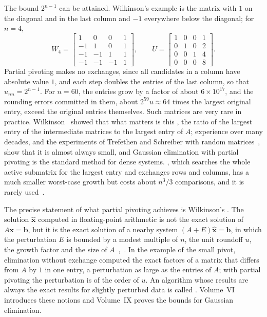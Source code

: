 The bound $2^{n-1}$ can be attained. Wilkinson's example is the matrix with $1$ on the diagonal and in the last column and $-1$ everywhere below the diagonal; for $n=4$,
\[
W_4=\begin{bmatrix}1&0&0&1\\-1&1&0&1\\-1&-1&1&1\\-1&-1&-1&1\end{bmatrix},\qquad U=\begin{bmatrix}1&0&0&1\\0&1&0&2\\0&0&1&4\\0&0&0&8\end{bmatrix}.
\]
Partial pivoting makes no exchanges, since all candidates in a column have absolute value $1$, and each step doubles the entries of the last column, so that $u_{nn}=2^{n-1}$. For $n=60$, the entries grow by a factor of about $6\times10^{17}$, and the rounding errors committed in them, about $2^{59}u\approx64$ times the largest original entry, exceed the original entries themselves. Such matrices are very rare in practice. Wilkinson~\cite{wilkinson1961} showed that what matters is this , the ratio of the largest entry of the intermediate matrices to the largest entry of $A$; experience over many decades, and the experiments of Trefethen and Schreiber with random matrices~\cite{trefethen1990}, show that it is almost always small, and Gaussian elimination with partial pivoting is the standard method for dense systems. , which searches the whole active submatrix for the largest entry and exchanges rows and columns, has a much smaller worst-case growth but costs about $n^3/3$ comparisons, and it is rarely used~\cite[Sect.~9.4]{higham2002accuracy}.

The precise statement of what partial pivoting achieves is Wilkinson's . The solution $\hat{\mathbf x}$ computed in floating-point arithmetic is not the exact solution of $A\mathbf x=\mathbf b$, but it is the exact solution of a nearby system $(A+E)\hat{\mathbf x}=\mathbf b$, in which the perturbation $E$ is bounded by a modest multiple of $n$, the unit roundoff $u$, the growth factor and the size of $A$~\cite{wilkinson1961},~\cite[Chap.~9]{higham2002accuracy}. In the example of the small pivot, elimination without exchange computed the exact factors of a matrix that differs from $A$ by $1$ in one entry, a perturbation as large as the entries of $A$; with partial pivoting the perturbation is of the order of $u$. An algorithm whose results are always the exact results for slightly perturbed data is called . Volume~VI introduces these notions and Volume~IX proves the bounds for Gaussian elimination.

